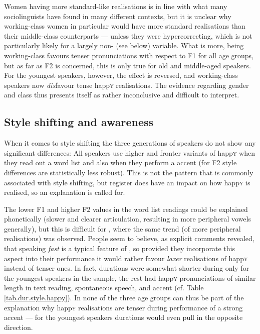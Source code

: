 Women having more standard-like realisations is in line with what many sociolinguists have found in many different contexts, but it is unclear why working-class women in particular would have more standard realisations than their middle-class counterparts --- unless they were hypercorrecting, which is not particularly likely for a largely non- (see below) variable.
What is more, being working-class favours tenser pronunciations with respect to F1 for all age groups, but as far as F2 is concerned, this is only true for old and middle-aged speakers.
For the youngest speakers, however, the effect is reversed, and working-class speakers now \emph{dis}favour tense happ\textsc{y} realisations.
The evidence regarding gender and class thus presents itself as rather inconclusive and difficult to interpret.

\subsection{Style shifting and awareness}
\label{prod.disc.happy.style}

When it comes to style shifting the three generations of speakers do not show any significant differences: All speakers use higher and fronter variants of happ\textsc{y} when they read out a word list and also when they perform a   accent (for F2 style differences are statistically less robust).
This is not the pattern that is commonly associated with  style shifting, but register does have an impact on how happ\textsc{y} is realised, so an explanation is called for.

The lower F1 and higher F2 values in the word list readings could be explained phonetically (slower and clearer articulation, resulting in more peripheral vowels generally), but this is difficult for , where the same trend (of more peripheral realisations) was observed.
People seem to believe, as explicit comments revealed, that speaking \emph{fast} is a typical feature of , so provided they incorporate this aspect into their  performance it would rather favour \emph{laxer} realisations of happ\textsc{y} instead of tenser ones.
In fact,  durations were somewhat shorter during  only for the youngest speakers in the sample, the rest had happ\textsc{y} pronunciations of similar length in text reading, spontaneous speech, and accent  (cf. Table \ref{tab.dur.style.happy}).
In none of the three age groups can  thus be part of the explanation why happ\textsc{y} realisations are tenser during performance of a strong  accent --- for the youngest speakers durations would even pull in the opposite direction.

